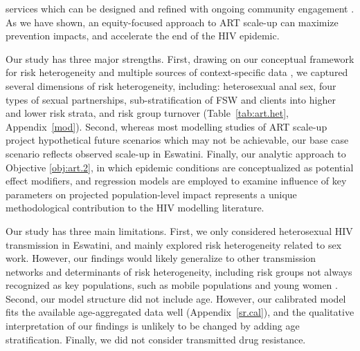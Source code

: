 services which can be designed and refined with ongoing community engagement
\cite{Chikwari2018,Mlambo2019,Comins2022}.
As we have shown, an equity-focused approach to ART scale-up can maximize prevention impacts,
and accelerate the end of the HIV epidemic.
\par
Our study has three major strengths.
First, drawing on our conceptual framework for risk heterogeneity \cite[Table~1]{Knight2022sr}
and multiple sources of context-specific data
\cite{SDHS2006,SHIMS1,SHIMS2,Baral2014,EswKP2014,EswIBBS2022},
we captured several dimensions of risk heterogeneity, including:
heterosexual anal sex,
four types of sexual partnerships,
sub-stratification of FSW and clients into higher and lower risk strata,
and risk group turnover
(Table~\ref{tab:art.het}, Appendix~\ref{mod}).
Second, whereas most modelling studies of ART scale-up
project hypothetical future scenarios which may not be achievable,
our base case scenario reflects observed scale-up in Eswatini.
Finally, our analytic approach to Objective \ref{obj:art.2},
in which epidemic conditions are conceptualized as potential effect modifiers,
and regression models are employed to examine influence of key parameters on projected population-level impact
represents a unique methodological contribution to the HIV modelling literature.
\par
Our study has three main limitations.
First, we only considered heterosexual HIV transmission in Eswatini,
and mainly explored risk heterogeneity related to sex work.
However, our findings would likely generalize
to other transmission networks and determinants of risk heterogeneity,
including risk groups not always recognized as key populations,
such as mobile populations and young women \cite{Camlin2019,Cheuk2020}.
Second, our model structure did not include age.
However, our calibrated model fits
the available age-aggregated data well (Appendix~\ref{sr.cal}),
and the qualitative interpretation of our findings
is unlikely to be changed by adding age stratification.
Finally, we did not consider transmitted drug resistance.

